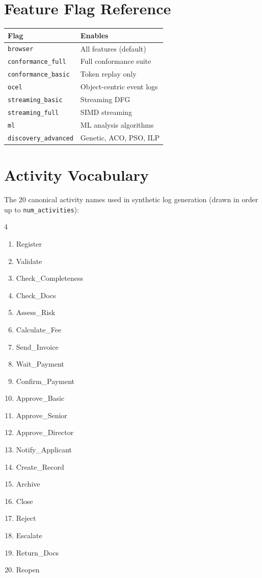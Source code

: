 \documentclass[11pt,a4paper]{article}
\begin{document}
\appendix

\section{Feature Flag Reference}
\label{app:featureflags}

\begin{center}
\begin{tabular}{@{}ll@{}}
\toprule
\textbf{Flag} & \textbf{Enables} \\
\midrule
\texttt{browser}              & All features (default) \\
\texttt{conformance\_full}    & Full conformance suite \\
\texttt{conformance\_basic}   & Token replay only \\
\texttt{ocel}                 & Object-centric event logs \\
\texttt{streaming\_basic}     & Streaming DFG \\
\texttt{streaming\_full}      & SIMD streaming \\
\texttt{ml}                   & ML analysis algorithms \\
\texttt{discovery\_advanced}  & Genetic, ACO, PSO, ILP \\
\bottomrule
\end{tabular}
\end{center}

\section{Activity Vocabulary}
\label{app:activities}

The 20 canonical activity names used in synthetic log generation
(drawn in order up to \texttt{num\_activities}):

\begin{multicols}{4}
\begin{enumerate}
\item Register
\item Validate
\item Check\_Completeness
\item Check\_Docs
\item Assess\_Risk
\item Calculate\_Fee
\item Send\_Invoice
\item Wait\_Payment
\item Confirm\_Payment
\item Approve\_Basic
\item Approve\_Senior
\item Approve\_Director
\item Notify\_Applicant
\item Create\_Record
\item Archive
\item Close
\item Reject
\item Escalate
\item Return\_Docs
\item Reopen
\end{enumerate}
\end{multicols}
\end{document}
